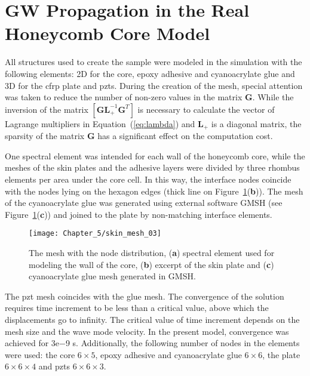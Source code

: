 \section{GW Propagation in the Real Honeycomb Core Model}
\label{sec:honeycomb}

All structures used to create the sample were modeled in the simulation with the following elements: 2D for the core, epoxy adhesive and cyanoacrylate glue and 3D for the \ac{cfrp} plate and \acp{pzt}.
During the creation of the mesh, special attention was taken to reduce the number of non-zero values in the matrix \(\textbf{G}\). While the inversion of the matrix \(\left [\textbf{GL}_+^{-1}\textbf{G}^T\right ]\) is necessary to calculate the vector of Lagrange multipliers in \mbox{Equation~(\ref{eq:lambda})} and \(\textbf{L}_+\) is a diagonal matrix, the sparsity of the matrix \(\textbf{G}\) has a significant effect on the computation cost.

One spectral element was intended for each wall of the honeycomb core, while the meshes of the skin plates and the adhesive layers were divided by three rhombus elements per area under the core cell.
In this way, the interface nodes coincide with the nodes lying on the hexagon edges (thick line on Figure~\ref{fig:skin_mesh}(\textbf{b})). %
The mesh of the cyanoacrylate glue was generated using external software GMSH \cite{geuzaine2009gmsh} (see Figure~\ref{fig:skin_mesh}(\textbf{c})) and joined to the plate by non-matching interface elements.

\vspace{-6pt}
\begin{figure}[H]
	\texttt{[image: Chapter\_5/skin\_mesh\_03]}
	\caption{The mesh with the node distribution, (\textbf{a}) spectral element used for modeling the wall of the core, (\textbf{b}) excerpt of the skin plate and (\textbf{c}) cyanoacrylate glue mesh generated in GMSH.}
	\label{fig:skin_mesh}
\end{figure}

The \ac{pzt} mesh coincides with the glue mesh.
The convergence of the solution requires time increment to be less than a critical value, above which the displacements go to infinity.
The critical value of time increment depends on the mesh size and the wave mode velocity.
In the present model, convergence was achieved for 3e{$-$9} s.
Additionally, the following number of nodes in the elements were used: the core \(6 \times 5\), epoxy adhesive and cyanoacrylate glue \(6 \times 6\), the plate \(6 \times 6 \times 4\) and \acp{pzt} \(6 \times 6 \times 3\).